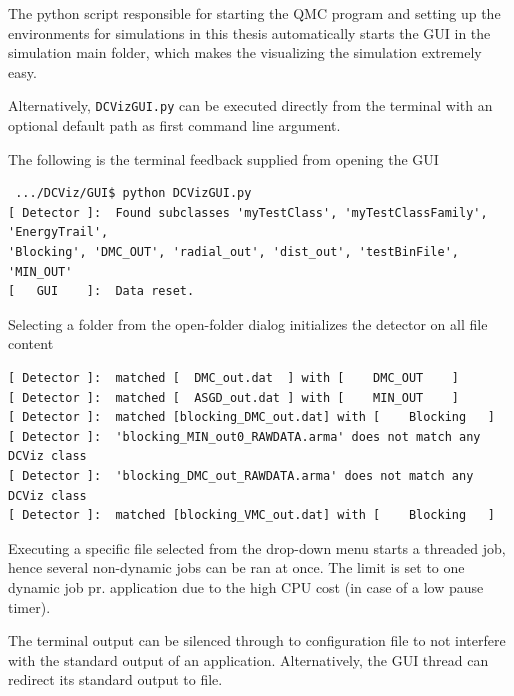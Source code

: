 The python script responsible for starting the QMC program and setting up the environments for simulations in this thesis automatically starts the GUI in the simulation main folder, which makes the visualizing the simulation extremely easy.

Alternatively, \verb+DCVizGUI.py+ can be executed directly from the terminal with an optional default path as first command line argument. 

The following is the terminal feedback supplied from opening the GUI

\begin{verbatim}
 .../DCViz/GUI$ python DCVizGUI.py
[ Detector ]:  Found subclasses 'myTestClass', 'myTestClassFamily', 'EnergyTrail', 
'Blocking', 'DMC_OUT', 'radial_out', 'dist_out', 'testBinFile', 'MIN_OUT'
[   GUI    ]:  Data reset.
\end{verbatim}

Selecting a folder from the open-folder dialog initializes the detector on all file content

\begin{verbatim}
[ Detector ]:  matched [  DMC_out.dat  ] with [    DMC_OUT    ]
[ Detector ]:  matched [  ASGD_out.dat ] with [    MIN_OUT    ]
[ Detector ]:  matched [blocking_DMC_out.dat] with [    Blocking   ]
[ Detector ]:  'blocking_MIN_out0_RAWDATA.arma' does not match any DCViz class
[ Detector ]:  'blocking_DMC_out_RAWDATA.arma' does not match any DCViz class
[ Detector ]:  matched [blocking_VMC_out.dat] with [    Blocking   ]
\end{verbatim}

Executing a specific file selected from the drop-down menu starts a threaded job, hence several non-dynamic jobs can be ran at once. The limit is set to one dynamic job pr. application due to the high CPU cost (in case of a low pause timer).

The terminal output can be silenced through to configuration file to not interfere with the standard output of an application. Alternatively, the GUI thread can redirect its standard output to file.





